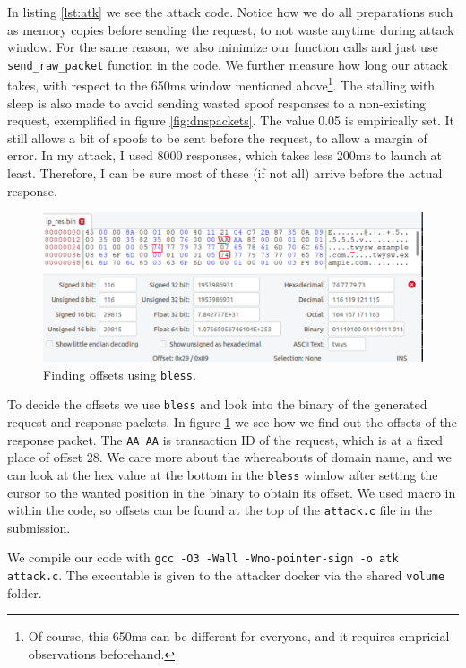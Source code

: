 \documentclass[12pt,reqno]{amsart}
\newcommand{\code}[1]{\texttt{#1}}
\begin{document}
In listing \ref{lst:atk} we see the attack code. Notice how we do all preparations such as memory copies before sending the request, to not waste anytime during attack window. For the same reason, we also minimize our function calls and just use \code{send\_raw\_packet} function in the code. We further measure how long our attack takes, with respect to the 650ms window mentioned above\footnote{Of course, this 650ms can be different for everyone, and it requires empricial observations beforehand.}. The stalling with sleep is also made to avoid sending wasted spoof responses to a non-existing request, exemplified in figure \ref{fig:dnspackets}. The value 0.05 is empirically set. It still allows a bit of spoofs to be sent before the request, to allow a margin of error. In my attack, I used 8000 responses, which takes less 200ms to launch at least. Therefore, I can be sure most of these (if not all) arrive before the actual response.

\begin{figure}[h]
\includegraphics[width=\linewidth]{screenshots/offsets.png}
\caption{Finding offsets using \code{bless}.}
\label{fig:offsets}
\end{figure}

To decide the offsets we use \code{bless} and look into the binary of the generated request and response packets. In figure \ref{fig:offsets} we see how we find out the offsets of the response packet. The \code{AA AA} is transaction ID of the request, which is at a fixed place of offset 28. We care more about the whereabouts of domain name, and we can look at the hex value at the bottom in the \code{bless} window after setting the cursor to the wanted position in the binary to obtain its offset. We used macro in within the code, so offsets can be found at the top of the \code{attack.c} file in the submission.

We compile our code with \code{gcc -O3 -Wall -Wno-pointer-sign -o atk attack.c}. The executable is given to the attacker docker via the shared \code{volume} folder. 
\end{document}
